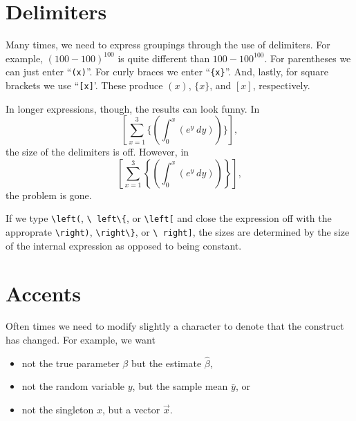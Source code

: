 \section{Delimiters}
Many times, we need to express groupings through the use of delimiters. For
example, $(100 - 100)^{100}$ is quite different than $100 - 100^{100}$. For
parentheses we can just enter ``\texttt{(x)}''. For curly braces we enter
``\texttt{\{x\}}''. And, lastly, for square brackets we use
``\texttt{[x]}'. These produce $(x)$, $\{x\}$, and $[x]$, respectively.

In longer expressions, though, the results can look funny.  In
\[
[\sum_{x=1}^{3} \{ (\int_{0}^{x} (e^{y}~dy))\}],
\]
the size of the delimiters is off. However, in
\[
\left[\sum_{x=1}^{3} \left\{ \left(\int_{0}^{x} (e^{y}~dy)\right)\right\}\right],
\]
the problem is gone.

If we type \texttt{\textbackslash left(}, \texttt{\textbackslash
  left\textbackslash\{}, or \texttt{\textbackslash left[} and close the
expression off with the approprate \texttt{\textbackslash right)},
\texttt{\textbackslash right\textbackslash\}}, or \texttt{\textbackslash
  right]}, the sizes are determined by the size of the internal expression as
opposed to being constant.

\section{Accents}

Often times we need to modify slightly a character to denote that the construct
has changed. For example, we want

\begin{itemize}
\item not the true parameter $\beta$ but the estimate $\hat{\beta}$,
\item not the random variable $y$, but the sample mean $\bar{y}$, or
\item not the singleton $x$, but a vector $\vec{x}$.
\end{itemize}

